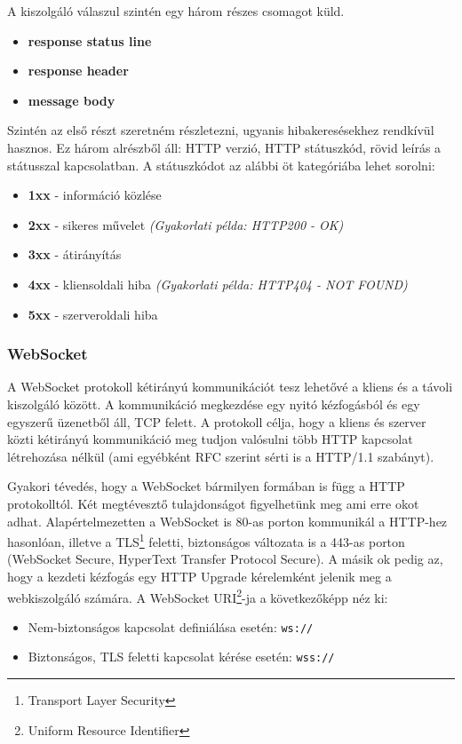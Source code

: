 A kiszolgáló válaszul szintén egy három részes csomagot küld.
\begin{itemize}
    \item \textbf{response status line}
    \item \textbf{response header}
    \item \textbf{message body}
\end{itemize}
Szintén az első részt szeretném részletezni, ugyanis hibakeresésekhez rendkívül hasznos. Ez három alrészből áll: HTTP verzió, HTTP státuszkód, rövid leírás a státusszal kapcsolatban. A státuszkódot az alábbi öt kategóriába lehet sorolni:
\begin{itemize}
    \item \textbf{1xx} - információ közlése
    \item \textbf{2xx} - sikeres művelet \textit{(Gyakorlati példa: HTTP200 - OK)}
    \item \textbf{3xx} - átirányítás
    \item \textbf{4xx} - kliensoldali hiba \textit{(Gyakorlati példa: HTTP404 - NOT FOUND)}
    \item \textbf{5xx} - szerveroldali hiba
\end{itemize}

\subsubsection{WebSocket}
A WebSocket protokoll kétirányú kommunikációt tesz lehetővé a kliens és a távoli kiszolgáló között. A kommunikáció megkezdése egy nyitó kézfogásból és egy egyszerű üzenetből áll, TCP felett. A protokoll célja, hogy a kliens és szerver közti kétirányú kommunikáció meg tudjon valósulni több HTTP kapcsolat létrehozása nélkül (ami egyébként RFC szerint sérti is a HTTP/1.1 szabányt\cite{HTTP_RFC})\cite{WS_RFC}.

Gyakori tévedés, hogy a WebSocket bármilyen formában is függ a HTTP protokolltól. Két megtévesztő tulajdonságot figyelhetünk meg ami erre okot adhat. Alapértelmezetten a WebSocket is 80-as porton kommunikál a HTTP-hez hasonlóan, illetve a TLS\footnote{Transport Layer Security} feletti, biztonságos változata is a 443-as porton (WebSocket Secure, HyperText Transfer Protocol Secure). A másik ok pedig az, hogy a kezdeti kézfogás egy HTTP Upgrade kérelemként jelenik meg a webkiszolgáló számára.
A WebSocket URI\footnote{Uniform Resource Identifier}-ja a következőképp néz ki:
\begin{itemize}
    \item Nem-biztonságos kapcsolat definiálása esetén: \lstinline{ws://}
    \item Biztonságos, TLS feletti kapcsolat kérése esetén: \lstinline{wss://}
\end{itemize}

